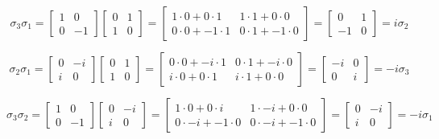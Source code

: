 \documentclass[12pt]{article}
\begin{document}
\begin{enumerate}
\begin{equation}
\sigma_3 \sigma_1 =
\begin{bmatrix}
1 & 0\\
0 & -1
\end{bmatrix}
\begin{bmatrix}
0 & 1\\
1 & 0
\end{bmatrix}
=
\begin{bmatrix}
1\cdot 0 + 0\cdot 1 & 1\cdot 1 + 0\cdot 0\\
0\cdot 0 + -1 \cdot 1 & 0\cdot 1 + -1\cdot 0
\end{bmatrix}
=
\begin{bmatrix}
0 & 1\\
-1 & 0
\end{bmatrix}
= i \sigma_2
\end{equation}

\begin{equation}
\sigma_2 \sigma_1 =
\begin{bmatrix}
0 & -i\\
i & 0
\end{bmatrix}
\begin{bmatrix}
0 & 1\\
1 & 0
\end{bmatrix}
=
\begin{bmatrix}
0\cdot 0 + -i\cdot 1 & 0\cdot 1 + -i\cdot 0\\
i\cdot 0 + 0 \cdot 1 & i\cdot 1 + 0\cdot 0
\end{bmatrix}
=
\begin{bmatrix}
-i & 0\\
0 & i
\end{bmatrix}
= -i \sigma_3
\end{equation}

\begin{equation}
\sigma_3 \sigma_2 =
\begin{bmatrix}
1 & 0\\
0 & -1
\end{bmatrix}
\begin{bmatrix}
0 & -i\\
i & 0
\end{bmatrix}
=
\begin{bmatrix}
1\cdot 0 + 0\cdot i & 1\cdot -i + 0\cdot 0\\
0\cdot -i + -1 \cdot 0 & 0\cdot -i + -1\cdot 0
\end{bmatrix}
=
\begin{bmatrix}
0 & -i\\
i & 0
\end{bmatrix}
= -i \sigma_1
\end{equation}


\end{enumerate}
\end{document}

